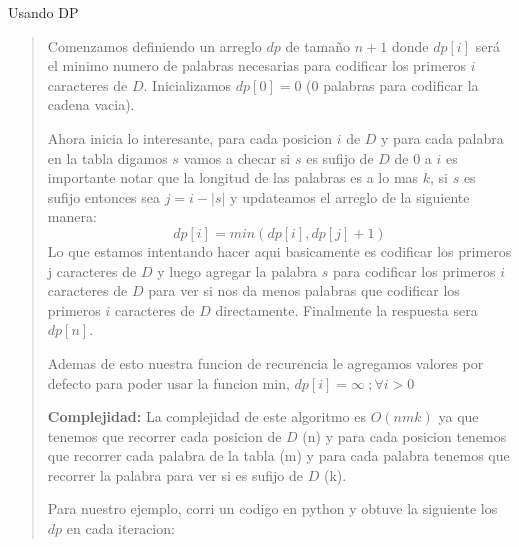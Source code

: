 \textcolor{bibi}{Usando DP}
\begin{quote}
    Comenzamos definiendo un arreglo $dp$ de tamaño $n+1$ donde $dp[i]$ será el minimo numero de palabras necesarias para codificar los primeros $i$ caracteres de $D$. Inicializamos $dp[0] = 0$ (0 palabras para codificar la cadena vacia). \vspace{.2cm}
    
    Ahora inicia lo interesante, para cada posicion $i$ de $D$ y para cada palabra en la tabla digamos $s$ vamos a checar si $s$ es sufijo de $D$ de 0 a $i$ es importante notar que la longitud de las palabras es a lo mas $k$, si $s$ es sufijo entonces sea $j = i - |s|$ y updateamos el arreglo de la siguiente manera: $$dp[i]=min(dp[i],dp[j]+1)$$ Lo que estamos intentando hacer aqui basicamente es codificar los primeros j caracteres de $D$ y luego agregar la palabra $s$ para codificar los primeros $i$ caracteres de $D$ para ver si nos da menos palabras que codificar los primeros $i$ caracteres de $D$ directamente. Finalmente la respuesta sera $dp[n]$. \vspace{.2cm}

    Ademas de esto nuestra funcion de recurencia le agregamos valores por defecto para poder usar la funcion min, $dp[i]=\infty \ ;  \forall i>0$ \vspace{.2cm}

    \textbf{Complejidad:} La complejidad de este algoritmo es $O(nmk)$ ya que tenemos que recorrer cada posicion de $D$ (n) y para cada posicion tenemos que recorrer cada palabra de la tabla (m) y para cada palabra tenemos que recorrer la palabra para ver si es sufijo de $D$ (k).

    Para nuestro ejemplo, corri un codigo en python y obtuve la siguiente los $dp$ en cada iteracion:


\end{quote}
